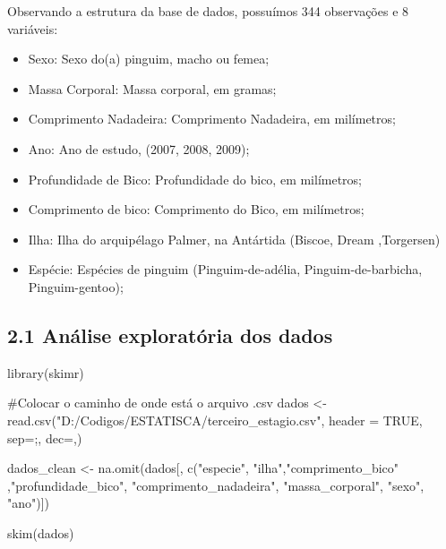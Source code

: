 \documentclass[
  letterpaper,
  DIV=11,
  numbers=noendperiod]{scrartcl}
\newenvironment{Shaded}{\begin{snugshade}}{\end{snugshade}}
\newcommand{\AttributeTok}[1]{\textcolor[rgb]{0.40,0.45,0.13}{#1}}
\newcommand{\CommentTok}[1]{\textcolor[rgb]{0.37,0.37,0.37}{#1}}
\newcommand{\ConstantTok}[1]{\textcolor[rgb]{0.56,0.35,0.01}{#1}}
\newcommand{\FunctionTok}[1]{\textcolor[rgb]{0.28,0.35,0.67}{#1}}
\newcommand{\NormalTok}[1]{\textcolor[rgb]{0.00,0.23,0.31}{#1}}
\newcommand{\OtherTok}[1]{\textcolor[rgb]{0.00,0.23,0.31}{#1}}
\newcommand{\StringTok}[1]{\textcolor[rgb]{0.13,0.47,0.30}{#1}}
\begin{document}
Observando a estrutura da base de dados, possuímos 344 observações e 8
variáveis:

\begin{itemize}
\item
  Sexo: Sexo do(a) pinguim, macho ou femea;
\item
  Massa Corporal: Massa corporal, em gramas;
\item
  Comprimento Nadadeira: Comprimento Nadadeira, em milímetros;
\item
  Ano: Ano de estudo, (2007, 2008, 2009);
\item
  Profundidade de Bico: Profundidade do bico, em milímetros;
\item
  Comprimento de bico: Comprimento do Bico, em milímetros;
\item
  Ilha: Ilha do arquipélago Palmer, na Antártida (Biscoe, Dream
  ,Torgersen)
\item
  Espécie: Espécies de pinguim (Pinguim-de-adélia, Pinguim-de-barbicha,
  Pinguim-gentoo);
\end{itemize}

\subsection{2.1 Análise exploratória dos
dados}\label{anuxe1lise-exploratuxf3ria-dos-dados}

\begin{Shaded}
\begin{Highlighting}[]
\FunctionTok{library}\NormalTok{(skimr)}

\CommentTok{\#Colocar o caminho de onde está o arquivo .csv}
\NormalTok{dados }\OtherTok{\textless{}{-}} \FunctionTok{read.csv}\NormalTok{(}\StringTok{"D:/Codigos/ESTATISCA/terceiro\_estagio.csv"}\NormalTok{, }\AttributeTok{header =} \ConstantTok{TRUE}\NormalTok{, }\AttributeTok{sep=}\StringTok{\textquotesingle{};\textquotesingle{}}\NormalTok{, }\AttributeTok{dec=}\StringTok{\textquotesingle{},\textquotesingle{}}\NormalTok{)}

\NormalTok{dados\_clean }\OtherTok{\textless{}{-}} \FunctionTok{na.omit}\NormalTok{(dados[, }\FunctionTok{c}\NormalTok{(}\StringTok{"especie"}\NormalTok{, }\StringTok{"ilha"}\NormalTok{,}\StringTok{"comprimento\_bico"}\NormalTok{ ,}\StringTok{"profundidade\_bico"}\NormalTok{, }\StringTok{"comprimento\_nadadeira"}\NormalTok{, }\StringTok{"massa\_corporal"}\NormalTok{, }\StringTok{"sexo"}\NormalTok{, }\StringTok{"ano"}\NormalTok{)])}

\FunctionTok{skim}\NormalTok{(dados)}
\end{Highlighting}
\end{Shaded}
\end{document}
